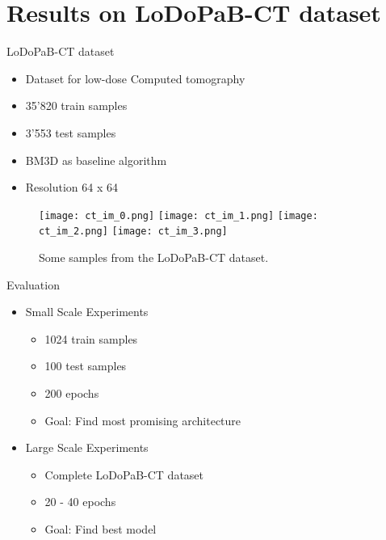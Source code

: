 
\section{Results on LoDoPaB-CT dataset}

\begin{frame}{LoDoPaB-CT dataset}
\begin{itemize}
    \item Dataset for low-dose Computed tomography
    \item 35'820 train samples
    \item 3'553 test samples
    \item BM3D as baseline algorithm
    \item Resolution 64 x 64
\end{itemize}

\begin{figure}
    \centering
    \hfill
    \texttt{[image: ct\_im\_0.png]}
    \hfill
    \texttt{[image: ct\_im\_1.png]}
    \hfill
    \texttt{[image: ct\_im\_2.png]}
    \hfill
    \texttt{[image: ct\_im\_3.png]}
    \hfill
    \caption{Some samples from the LoDoPaB-CT dataset.}
  \end{figure}
\end{frame}


\begin{frame}{Evaluation}
\begin{itemize}
    \item Small Scale Experiments
    \begin{itemize}
        \item 1024 train samples
        \item 100 test samples
        \item 200 epochs
        \item<2> \alert{Goal: Find most promising architecture}
    \end{itemize}
    \item Large Scale Experiments
    \begin{itemize}
        \item Complete LoDoPaB-CT dataset
        \item 20 - 40 epochs
        \item<2> \alert{Goal: Find best model}
    \end{itemize}
\end{itemize}
\end{frame}

